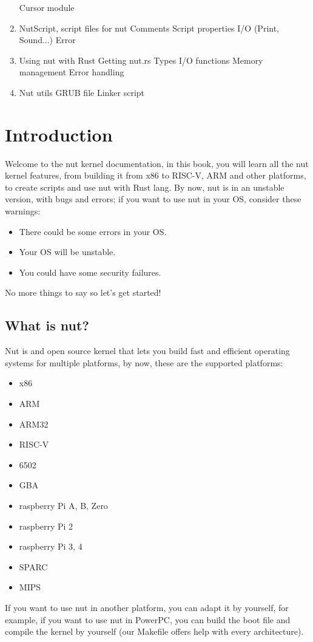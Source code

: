 \documentclass{article}
\begin{document}
\begin{enumerate}
    \large \subitem Cursor module
    \\
  	\Large \item NutScript, script files for nut
  	\large \subitem Comments
    \large \subitem Script properties
    \large \subitem I/O (Print, Sound...)
    \large \subitem Error
    \\
    \Large \item Using nut with Rust
    \large \subitem Getting nut.rs
    \large \subitem Types
    \large \subitem I/O functions
    \large \subitem Memory management
    \large \subitem Error handling
    \\
    \Large \item Nut utils
    \large \subitem GRUB file
    \large \subitem Linker script
  \end{enumerate}
  \newpage

  \section{Introduction}
  Welcome to the nut kernel documentation, in this book, you will learn all the nut kernel features, from building it from x86 to RISC-V, ARM and other platforms, to create scripts and use nut with Rust lang. By now, nut is in an unstable version, with bugs and errors; if you want to use nut in your OS, consider these warnings:
  \begin{itemize}
    \item There could be some errors in your OS.
    \item Your OS will be unstable.
    \item You could have some security failures.
  \end{itemize}
  No more things to say so let's get started!
  \\
  \subsection{What is nut?}
  Nut is and open source kernel that lets you build fast and efficient operating systems for multiple platforms, by now, these are the supported platforms:
  \begin{itemize}
    \item x86
    \item ARM
    \item ARM32
    \item RISC-V
    \item 6502
    \item GBA
    \item raspberry Pi A, B, Zero
    \item raspberry Pi 2
    \item raspberry Pi 3, 4
    \item SPARC
    \item MIPS
  \end{itemize}
  If you want to use nut in another platform, you can adapt it by yourself, for example, if you want to use nut in PowerPC, you can build the boot file and compile the kernel by yourself (our Makefile offers help with every architecture).
  \\
\end{document}
